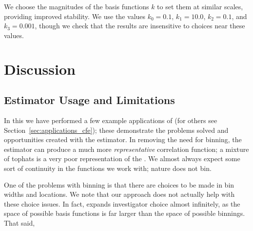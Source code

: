 We choose the magnitudes of the basis functions $k$ to set them at similar scales, providing improved stability.
We use the values $k_0=0.1$, $k_1=10.0$, $k_2=0.1$, and $k_3=0.001$, though we check that the results are insensitive to choices near these values.




\section{Discussion} \label{sec:discuss}

\subsection{Estimator Usage and Limitations}

In this \documentname we have performed a few example applications of \est (for others see Section~\ref{sec:applications_cfe}); these demonstrate the problems solved and opportunities created with the estimator.
In removing the need for binning, the estimator can produce a much more \textit{representative} correlation function; a mixture of tophats is a very poor representation of the \cf. 
We almost always expect some sort of continuity in the functions we work with; nature does not bin.

One of the problems with binning is that there are choices to be made in bin widths and locations.
We note that our approach does not actually help with these choice issues.
In fact, \est expands investigator choice almost infinitely, as the space of possible basis functions is far larger than the space of possible binnings.
That said, 

